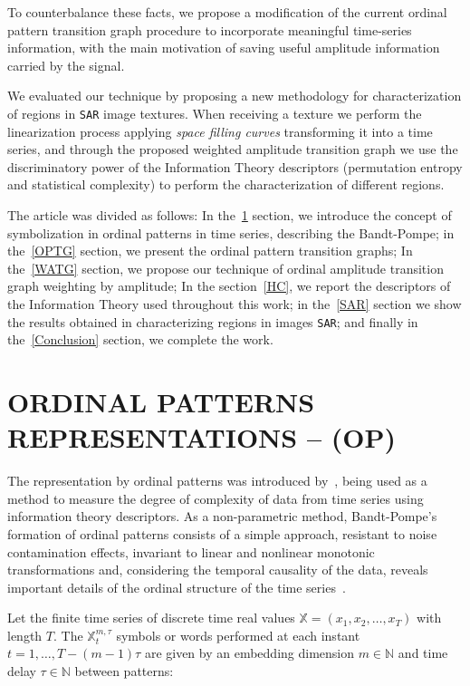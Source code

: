 \documentclass{isprs}
\begin{document}
	To counterbalance these facts, we propose a modification of the current ordinal pattern transition graph procedure to incorporate meaningful time-series information, with the main motivation of saving useful amplitude information carried by the signal.
	
	We evaluated our technique by proposing a new methodology for characterization of regions in \texttt{SAR} image textures.
	When receiving a texture we perform the linearization process applying \textit{space filling curves} transforming it into a time series, and through the proposed weighted amplitude transition graph we use the discriminatory power of the Information Theory descriptors (permutation entropy and statistical complexity) to perform the characterization of different regions.
	
	The article was divided as follows:
	In the~\ref{OP} section, we introduce the concept of symbolization in ordinal patterns in time series, describing the Bandt-Pompe;
	in the~\ref{OPTG} section, we present the ordinal pattern transition graphs;
	In the~\ref{WATG} section, we propose our technique of ordinal amplitude transition graph weighting by amplitude;
	In the section~\ref{HC}, we report the descriptors of the Information Theory used throughout this work;
	in the~\ref{SAR} section we show the results obtained in characterizing regions in images \texttt{SAR};
	and finally in the~\ref{Conclusion} section, we complete the work.
	
	\section{ORDINAL PATTERNS REPRESENTATIONS -- (OP)}\label{OP}
	
	The representation by ordinal patterns was introduced by~\cite{Bandt2002Permutation}, being used as a method to measure the degree of complexity of data from time series using information theory descriptors.
	As a non-parametric method, Bandt-Pompe's formation of ordinal patterns consists of a simple approach, resistant to noise contamination effects, invariant to linear and nonlinear monotonic transformations and, considering the temporal causality of the data, reveals important details of the ordinal structure of the time series~\citep{Larrondo2006Random}.
	
	Let the finite time series of discrete time real values $\mathbb{X} = (x_1, x_2, \dots, x_T)$ with length $T$.
	The $\mathbb{X}_t^{m, \tau} $ symbols or words performed at each instant $t = 1, \dots, T- (m-1) \tau$ are given by an embedding dimension $m \in \mathbb{N}$ and time delay $\tau \in \mathbb{N}$ between patterns:
	
\end{document}
